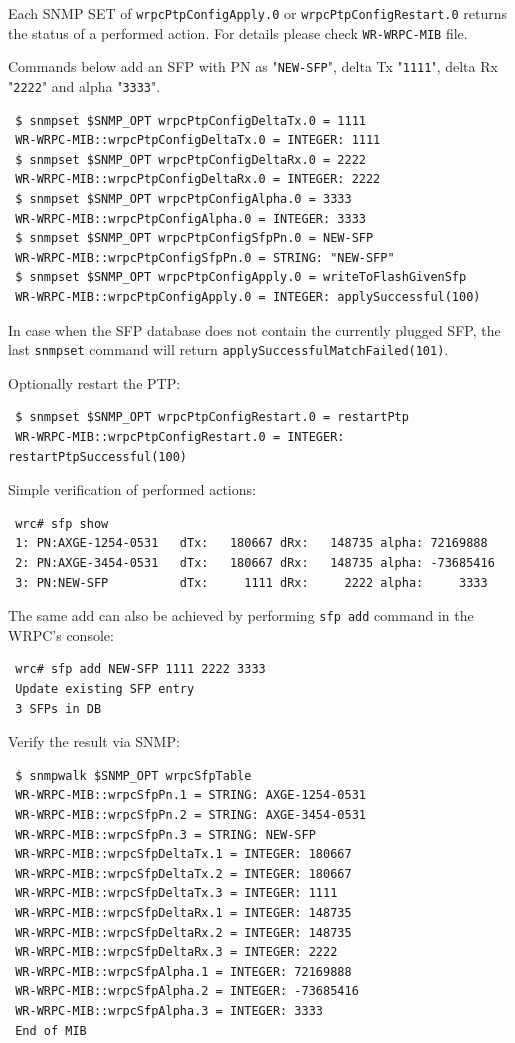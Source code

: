 \documentclass[a4paper, 12pt]{article}
\renewcommand{\_}{\underscore\allowbreak}
\begin{document}
Each SNMP SET of \texttt{wrpcPtpConfigApply.0} or \texttt{wrpcPtpConfigRestart.0} returns
the status of a performed action. For details please check \texttt{WR-WRPC-MIB}
file.

Commands below add an SFP with PN as "\texttt{NEW-SFP}", delta Tx "\texttt{1111}",
delta Rx "\texttt{2222}" and alpha "\texttt{3333}".
\begin{lstlisting}
 $ snmpset $SNMP_OPT wrpcPtpConfigDeltaTx.0 = 1111
 WR-WRPC-MIB::wrpcPtpConfigDeltaTx.0 = INTEGER: 1111
 $ snmpset $SNMP_OPT wrpcPtpConfigDeltaRx.0 = 2222
 WR-WRPC-MIB::wrpcPtpConfigDeltaRx.0 = INTEGER: 2222
 $ snmpset $SNMP_OPT wrpcPtpConfigAlpha.0 = 3333
 WR-WRPC-MIB::wrpcPtpConfigAlpha.0 = INTEGER: 3333
 $ snmpset $SNMP_OPT wrpcPtpConfigSfpPn.0 = NEW-SFP
 WR-WRPC-MIB::wrpcPtpConfigSfpPn.0 = STRING: "NEW-SFP"
 $ snmpset $SNMP_OPT wrpcPtpConfigApply.0 = writeToFlashGivenSfp
 WR-WRPC-MIB::wrpcPtpConfigApply.0 = INTEGER: applySuccessful(100)
\end{lstlisting}

In case when the SFP database does not contain the currently plugged SFP, the last
\texttt{snmpset} command will return \texttt{applySuccessfulMatchFailed(101)}.

Optionally restart the PTP:
\begin{lstlisting}
 $ snmpset $SNMP_OPT wrpcPtpConfigRestart.0 = restartPtp
 WR-WRPC-MIB::wrpcPtpConfigRestart.0 = INTEGER: restartPtpSuccessful(100)
\end{lstlisting}

Simple verification of performed actions:\\
\begin{minipage}{\textwidth}
\begin{lstlisting}
 wrc# sfp show
 1: PN:AXGE-1254-0531   dTx:   180667 dRx:   148735 alpha: 72169888
 2: PN:AXGE-3454-0531   dTx:   180667 dRx:   148735 alpha: -73685416
 3: PN:NEW-SFP          dTx:     1111 dRx:     2222 alpha:     3333
\end{lstlisting}
\end{minipage}

The same add can also be achieved by performing \texttt{sfp add} command in
the WRPC's console:
\begin{lstlisting}
 wrc# sfp add NEW-SFP 1111 2222 3333
 Update existing SFP entry
 3 SFPs in DB
\end{lstlisting}

Verify the result via SNMP:
\begin{lstlisting}
 $ snmpwalk $SNMP_OPT wrpcSfpTable
 WR-WRPC-MIB::wrpcSfpPn.1 = STRING: AXGE-1254-0531
 WR-WRPC-MIB::wrpcSfpPn.2 = STRING: AXGE-3454-0531
 WR-WRPC-MIB::wrpcSfpPn.3 = STRING: NEW-SFP
 WR-WRPC-MIB::wrpcSfpDeltaTx.1 = INTEGER: 180667
 WR-WRPC-MIB::wrpcSfpDeltaTx.2 = INTEGER: 180667
 WR-WRPC-MIB::wrpcSfpDeltaTx.3 = INTEGER: 1111
 WR-WRPC-MIB::wrpcSfpDeltaRx.1 = INTEGER: 148735
 WR-WRPC-MIB::wrpcSfpDeltaRx.2 = INTEGER: 148735
 WR-WRPC-MIB::wrpcSfpDeltaRx.3 = INTEGER: 2222
 WR-WRPC-MIB::wrpcSfpAlpha.1 = INTEGER: 72169888
 WR-WRPC-MIB::wrpcSfpAlpha.2 = INTEGER: -73685416
 WR-WRPC-MIB::wrpcSfpAlpha.3 = INTEGER: 3333
 End of MIB
\end{lstlisting}
\end{document}
